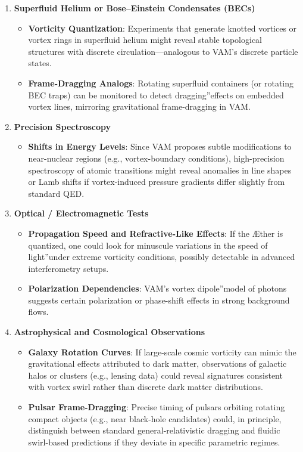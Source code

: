 \begin{enumerate}
    \item \textbf{Superfluid Helium or Bose–Einstein Condensates (BECs)}
    \begin{itemize}
        \item \textbf{Vorticity Quantization}: Experiments that generate knotted vortices or vortex rings in superfluid helium might reveal stable topological structures with discrete circulation—analogous to VAM's discrete particle states.
        \item \textbf{Frame-Dragging Analogs}: Rotating superfluid containers (or rotating BEC traps) can be monitored to detect \grqq dragging\textquotedblright effects on embedded vortex lines, mirroring gravitational frame-dragging in VAM.
    \end{itemize}

    \item \textbf{Precision Spectroscopy}
    \begin{itemize}
        \item \textbf{Shifts in Energy Levels}: Since VAM proposes subtle modifications to near-nuclear regions (e.g., vortex-boundary conditions), high-precision spectroscopy of atomic transitions might reveal anomalies in line shapes or Lamb shifts if vortex-induced pressure gradients differ slightly from standard QED.
    \end{itemize}

    \item \textbf{Optical / Electromagnetic Tests}
    \begin{itemize}
        \item \textbf{Propagation Speed and Refractive-Like Effects}: If the Æther is quantized, one could look for minuscule variations in the \grqq speed of light\textquotedblright under extreme vorticity conditions, possibly detectable in advanced interferometry setups.
        \item \textbf{Polarization Dependencies}: VAM's vortex \grqq dipole\textquotedblright model of photons suggests certain polarization or phase-shift effects in strong background flows.
    \end{itemize}

    \item \textbf{Astrophysical and Cosmological Observations}
    \begin{itemize}
        \item \textbf{Galaxy Rotation Curves}: If large-scale cosmic vorticity can mimic the gravitational effects attributed to dark matter, observations of galactic halos or clusters (e.g., lensing data) could reveal signatures consistent with vortex swirl rather than discrete dark matter distributions.
        \item \textbf{Pulsar Frame-Dragging}: Precise timing of pulsars orbiting rotating compact objects (e.g., near black-hole candidates) could, in principle, distinguish between standard general-relativistic dragging and fluidic swirl-based predictions if they deviate in specific parametric regimes.
    \end{itemize}
\end{enumerate}

